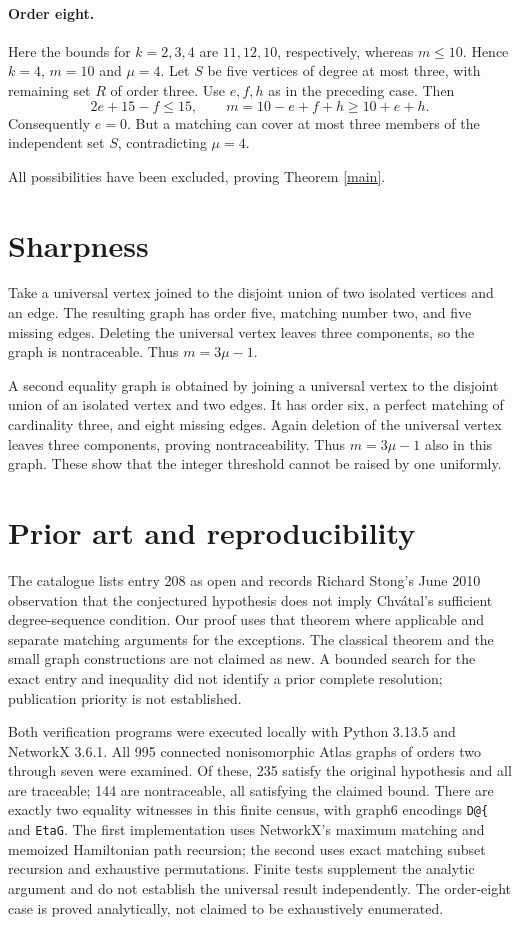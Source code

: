 \documentclass[11pt,a4paper]{article}
\begin{document}
\paragraph{Order eight.}
Here the bounds for $k=2,3,4$ are $11,12,10$, respectively, whereas $m\le10$. Hence $k=4$, $m=10$ and $\mu=4$. Let $S$ be five vertices of degree at most three, with remaining set $R$ of order three. Use $e,f,h$ as in the preceding case. Then
\[
2e+15-f\le15,\qquad m=10-e+f+h\ge10+e+h.
\]
Consequently $e=0$. But a matching can cover at most three members of the independent set $S$, contradicting $\mu=4$.

All possibilities have been excluded, proving Theorem \ref{main}.

\section{Sharpness}
Take a universal vertex joined to the disjoint union of two isolated vertices and an edge. The resulting graph has order five, matching number two, and five missing edges. Deleting the universal vertex leaves three components, so the graph is nontraceable. Thus $m=3\mu-1$.

A second equality graph is obtained by joining a universal vertex to the disjoint union of an isolated vertex and two edges. It has order six, a perfect matching of cardinality three, and eight missing edges. Again deletion of the universal vertex leaves three components, proving nontraceability. Thus $m=3\mu-1$ also in this graph. These show that the integer threshold cannot be raised by one uniformly.

\section{Prior art and reproducibility}
The catalogue lists entry 208 as open and records Richard Stong's June 2010 observation that the conjectured hypothesis does not imply Chv\'atal's sufficient degree-sequence condition. Our proof uses that theorem where applicable and separate matching arguments for the exceptions. The classical theorem and the small graph constructions are not claimed as new. A bounded search for the exact entry and inequality did not identify a prior complete resolution; publication priority is not established.

Both verification programs were executed locally with Python 3.13.5 and NetworkX 3.6.1. All 995 connected nonisomorphic Atlas graphs of orders two through seven were examined. Of these, 235 satisfy the original hypothesis and all are traceable; 144 are nontraceable, all satisfying the claimed bound. There are exactly two equality witnesses in this finite census, with graph6 encodings \texttt{D@\{} and \texttt{EtaG}. The first implementation uses NetworkX's maximum matching and memoized Hamiltonian path recursion; the second uses exact matching subset recursion and exhaustive permutations. Finite tests supplement the analytic argument and do not establish the universal result independently. The order-eight case is proved analytically, not claimed to be exhaustively enumerated.
\end{document}
